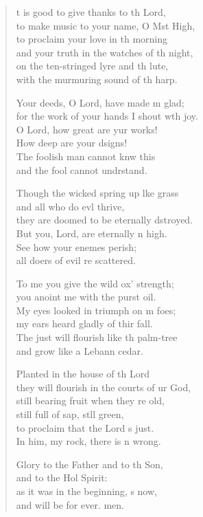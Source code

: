 \settowidth{\versewidth}{for the work of your hands I shout with joy.}
\begin{verse}%
  \begin{patverse}
t is good to give thanks to th Lord,\Med\\
    to make music to your name, O Mst High,\\
to proclaim your love in th morning\Med\\
    and your truth in the watches of th night,\\
on the ten-stringed lyre and th lute,\Med\\
    with the murmuring sound of th harp.

Your deeds, O Lord, have made m glad;\Med\\
    for the work of your hands I shout w\pointup{\i}th joy.\\
O Lord, how great are yur works!\Med\\
    How deep are your dsigns!\\
The foolish man cannot knw this\Med\\
    and the fool cannot undrstand.

Though the wicked spring up l\pointup{\i}ke grass\Med\\
    and all who do ev\pointup{\i}l thrive,\\
they are doomed to be eternally dstroyed.\Med\\
    But you, Lord, are eternally n high.\\
See how your enem\pointup{\i}es perish;\Med\\
    all doers of evil re scattered.

To me you give the wild ox’ strength;\Med\\
    you anoint me with the purst oil.\\
My eyes looked in triumph on m foes;\Med\\
    my ears heard gladly of thir fall.\\
The just will flourish like th palm-tree\Med\\
    and grow like a Lebann cedar.

Planted in the house of th Lord\Med\\
    they will flourish in the courts of ur God,\\
still bearing fruit when they re old,\Med\\
    still full of sap, st\pointup{\i}ll green,\\
to proclaim that the Lord \pointup{\i}s just.\Med\\
    In him, my rock, there is n wrong.

Glory to the Father and to th Son,\Med\\
    and to the Hol Spirit:\\
as it was in the beginning, \pointup{\i}s now,\Med\\
    and will be for ever. men.
  \end{patverse}
  \end{verse}
